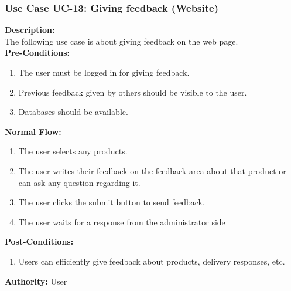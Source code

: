 \subsubsection{Use Case UC-13: Giving feedback (Website) }
\textbf{Description:}\\
The following use case is about giving feedback on the web page. 
\\
\textbf{Pre-Conditions:}
\begin{enumerate}
    \item The user must be logged in for giving feedback.
\item Previous feedback given by others should be visible to the user.
\item Databases should be available. 
\end{enumerate}
\textbf{Normal Flow:}\\
\begin{enumerate}
\item The user selects any products. 
\item The user writes their feedback on the feedback area about that product or can ask any question regarding it. 
\item The user clicks the submit button to send feedback. 
\item The user waits for a response from the administrator side \end{enumerate}
\textbf{Post-Conditions: }
\begin{enumerate}
\item	Users can efficiently give feedback about products, delivery responses, etc. 
\end{enumerate}
\textbf{Authority:}
User
      
